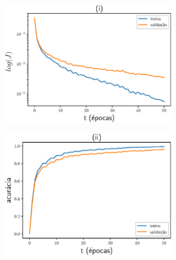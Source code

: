 \begin{figure}[ht]
	\begin{center}
		\caption{Dinâmica da arquitetura  $C_6C_{12}C_{36}C_{36}Fl_{100}MD$.}\label{fig:chosenModel}
		\begin{subfigure}{.5\textwidth}
			\centering
			\hspace{-0.02\linewidth}%
			\includegraphics[width=0.98\linewidth]{figuras/C5o6C5o12C5o36C5o36Rfl100MchD_loss.eps}
		\end{subfigure}\hfill%
		\begin{subfigure}{.5\textwidth}
			\centering
			\includegraphics[width=0.95\linewidth]{figuras/C5o6C5o12C5o36C5o36Rfl100MchD_acc.eps}
		\end{subfigure}\hfill%
		\newline
		\begin{subfigure}{.5\textwidth}

\end{subfigure}
\end{center}
\end{figure}
